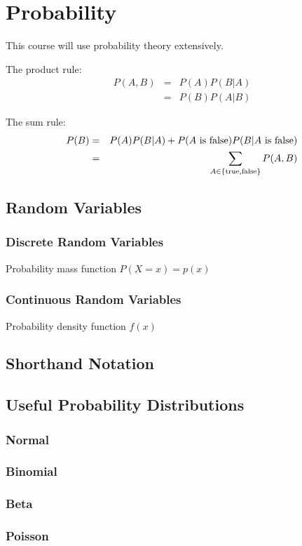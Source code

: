 \chapter{Probability}
This course will use probability theory extensively.

The product rule:
\begin{eqnarray}
P(A, B) &=& P(A)P(B|A) \\
&=& P(B)P(A|B)
\end{eqnarray}

The sum rule:
\begin{eqnarray}
P(B) &=& P(A)P(B|A) + P(A\textnormal{ is false})P(B|A\textnormal{ is false}) \\
&=& \sum_{A \in \{\rm true, false\}} P(A, B)
\end{eqnarray}


\section{Random Variables}

\subsection{Discrete Random Variables}
Probability mass function
$P(X=x) = p(x)$


\subsection{Continuous Random Variables}
Probability density function
$f(x)$


\section{Shorthand Notation}



\section{Useful Probability Distributions}

\subsection{Normal}


\subsection{Binomial}


\subsection{Beta}


\subsection{Poisson}


